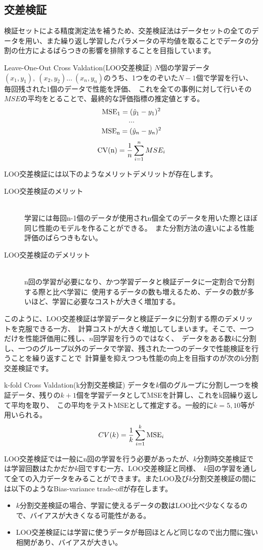 \documentclass[uplatex]{jsarticle}
\begin{document}
\subsection{交差検証}
検証セットによる精度測定法を補うため、交差検証法はデータセットの全てのデータを用い、また繰り返し学習したパラメータの平均値を取ることでデータの分割の仕方によるばらつきの影響を排除することを目指しています。
\begin{itembox}[l]{Leave-One-Out Cross Valdation(LOO交差検証)}
  $N$個の学習データ${(x_1, y_1),\ (x_2, y_2) \ldots\ (x_n, y_n)}$のうち、1つをのぞいた$N-1$個で学習を行い、毎回残された1個のデータで性能を評価、\
  これを全ての事例に対して行いその$MSE$の平均をとることで、最終的な評価指標の推定値とする。\\
  $$ {\rm MSE_1} = (\hat{y}_1-y_1)^2$$
  $$\dots$$
  $$ {\rm MSE_n} = (\hat{y}_n-y_n)^2$$
  $$ {\rm CV(n)} = \frac{1}{n}\sum_{i=1}^n MSE_i$$
\end{itembox}
LOO交差検証には以下のようなメリットデメリットが存在します。
  \begin{description}
    \item [LOO交差検証のメリット]\mbox{}\\
    学習には毎回n-1個のデータが使用されn個全てのデータを用いた際とほぼ同じ性能のモデルを作ることができる。\
    また分割方法の違いによる性能評価のばらつきもない。
    \item [LOO交差検証のデメリット]\mbox{}\\
    n回の学習が必要になり、かつ学習データと検証データに一定割合で分割する際と比べ学習に\
    使用するデータの数も増えるため、データの数が多いほど、学習に必要なコストが大きく増加する。
  \end{description}

このように、LOO交差検証は学習データと検証データに分割する際のデメリットを克服できる一方、\
計算コストが大きく増加してしまいます。そこで、一つだけを性能評価用に残し、$n$回学習を行うのではなく、\
データをある数$k$に分割し、一つのグループ以外のデータで学習、残された一つのデータで性能検証を行うことを繰り返すことで\
計算量を抑えつつも性能の向上を目指すのが次のk分割交差検証です。
\begin{itembox}[l]{k-fold Cross Valdation(k分割交差検証)}
  データを$k$個のグループに分割し一つを検証データ、残りの$k+1$個を学習データとしてMSEを計算し、これをk回繰り返して平均を取り、\
  この平均をテストMSEとして推定する。一般的に$k=5, 10$等が用いられる。
  $$CV(k) = \frac{1}{k}\sum_{i=1}^k {\rm MSE}_i$$
\end{itembox}
LOO交差検証では一般にn回の学習を行う必要があったが、$k$分割時交差検証では学習回数はたかだか$k$回ですむ一方、LOO交差検証と同様、\
$k$回の学習を通して全ての入力データをみることができます。またLOO及び$k$分割交差検証の間には以下のようなBias-variance trade-offが存在します。
  \begin{itemize}
    \item $k$分割交差検証の場合、学習に使えるデータの数はLOO比べ少なくなるので、バイアスが大きくなる可能性がある。
    \item LOO交差検証には学習に使うデータが毎回ほとんど同じなので出力間に強い相関があり、バイアスが大きい。
  \end{itemize}
\end{document}
